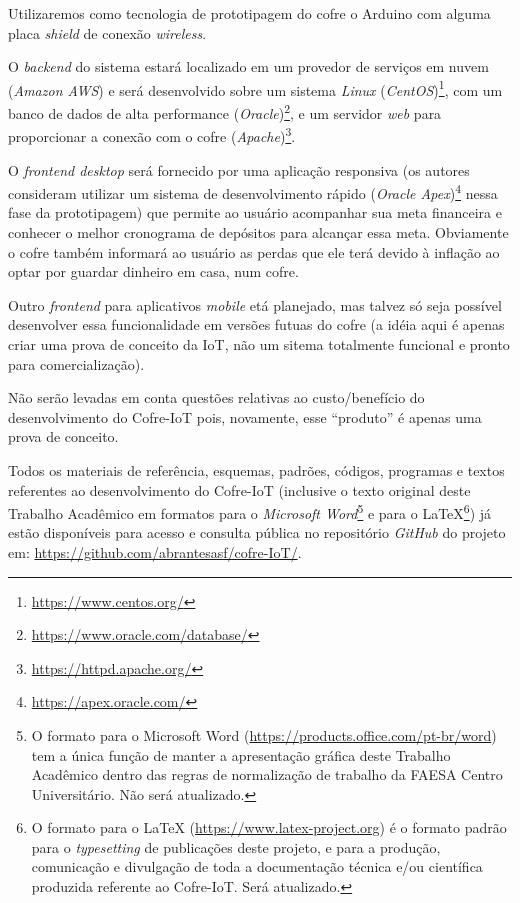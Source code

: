 \documentclass[pdftex, brazil, 12pt, twoside]{article}
\newcommand{\ingles}[1]{\textit{#1}}
\begin{document}
Utilizaremos como tecnologia de prototipagem do cofre o Arduino com alguma
placa \ingles{shield} de conexão \ingles{wireless}.

O \ingles{backend} do sistema estará localizado em um provedor de serviços em nuvem
(\ingles{Amazon AWS}) e será desenvolvido sobre um sistema \ingles{Linux} (\ingles{CentOS})\footnote{\url{https://www.centos.org/}},
com um banco de dados de alta performance (\ingles{Oracle})\footnote{\url{https://www.oracle.com/database/}},
e um servidor \ingles{web} para proporcionar a conexão com o cofre (\ingles{Apache})\footnote{\url{https://httpd.apache.org/}}.

O \ingles{frontend desktop} será fornecido por uma aplicação responsiva (os autores
consideram utilizar um sistema de desenvolvimento rápido (\ingles{Oracle Apex})\footnote{\url{https://apex.oracle.com/}}
nessa fase da prototipagem) que permite ao usuário acompanhar sua meta financeira
e conhecer o melhor cronograma de depósitos para alcançar essa meta.
Obviamente o cofre também informará ao usuário as perdas que ele terá devido
à inflação ao optar por guardar dinheiro em casa, num cofre.

Outro \ingles{frontend} para aplicativos \ingles{mobile} etá planejado, mas talvez
só seja possível desenvolver essa funcionalidade em versões futuas do cofre
(a idéia aqui é apenas criar uma prova de conceito da IoT, não um sitema
totalmente funcional e pronto para comercialização).

Não serão levadas em conta questões relativas ao custo/benefício do desenvolvimento
do Cofre-IoT pois, novamente, esse ``produto'' é apenas uma prova de conceito.

Todos os materiais de referência, esquemas, padrões, códigos, programas e textos
referentes ao desenvolvimento do Cofre-IoT (inclusive o texto original deste Trabalho
Acadêmico em formatos para o \ingles{Microsoft Word}\footnote{O formato para o Microsoft Word
  (\url{https://products.office.com/pt-br/word}) tem a única função de manter a apresentação
  gráfica deste Trabalho Acadêmico dentro das regras de normalização de trabalho
  da FAESA Centro Universitário. Não será atualizado.} e para o \LaTeX\footnote{O formato para o \LaTeX
  (\url{https://www.latex-project.org}) é o formato padrão para o \ingles{typesetting} de publicações
  deste projeto, e para a produção, comunicação e divulgação de toda a documentação
  técnica e/ou científica produzida referente ao Cofre-IoT. Será atualizado.}) já estão disponíveis
para acesso e consulta pública no repositório \ingles{GitHub} do projeto em:
\url{https://github.com/abrantesasf/cofre-IoT/}.
\end{document}
